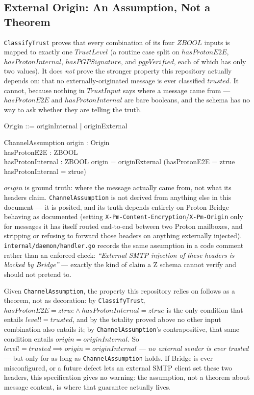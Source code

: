 \documentclass[a4paper,10pt,fleqn]{article}
\begin{document}
\subsection{External Origin: An Assumption, Not a Theorem}

\texttt{ClassifyTrust} proves that every combination of its four
$ZBOOL$ inputs is mapped to exactly one $TrustLevel$ (a routine case
split on $hasProtonE2E$, $hasProtonInternal$, $hasPGPSignature$, and
$pgpVerified$, each of which has only two values).  It does \emph{not}
prove the stronger property this repository actually depends on: that
no externally-originated message is ever classified $trusted$.  It
cannot, because nothing in $TrustInput$ says where a message came
from --- $hasProtonE2E$ and $hasProtonInternal$ are bare booleans, and
the schema has no way to ask whether they are telling the truth.

\begin{zed}
  Origin ::= originInternal | originExternal
\end{zed}

\begin{schema}{ChannelAssumption}
  origin : Origin \\
  hasProtonE2E : ZBOOL \\
  hasProtonInternal : ZBOOL
  \where
  origin = originExternal \implies
    \lnot (hasProtonE2E = ztrue \land hasProtonInternal = ztrue)
\end{schema}

$origin$ is ground truth: where the message actually came from, not
what its headers claim.  \texttt{ChannelAssumption} is not derived
from anything else in this document --- it is posited, and its truth
depends entirely on Proton Bridge behaving as documented (setting
\texttt{X-Pm-Content-Encryption}/\texttt{X-Pm-Origin} only for
messages it has itself routed end-to-end between two Proton
mailboxes, and stripping or refusing to forward those headers on
anything externally injected).  \texttt{internal/daemon/handler.go}
records the same assumption in a code comment rather than an
enforced check: \textit{``External SMTP injection of these headers is
blocked by Bridge''} --- exactly the kind of claim a Z schema cannot
verify and should not pretend to.

Given \texttt{ChannelAssumption}, the property this repository relies
on follows as a theorem, not as decoration: by \texttt{ClassifyTrust},
$hasProtonE2E = ztrue \land hasProtonInternal = ztrue$ is the only
condition that entails $level! = trusted$, and by the totality proved
above no other input combination also entails it; by
\texttt{ChannelAssumption}'s contrapositive, that same condition
entails $origin = originInternal$.  So $level! = trusted \implies
origin = originInternal$ --- \emph{no external sender is ever
trusted} --- but only for as long as \texttt{ChannelAssumption} holds.
If Bridge is ever misconfigured, or a future defect lets an external
SMTP client set these two headers, this specification gives no
warning: the assumption, not a theorem about message content, is
where that guarantee actually lives.
\end{document}
